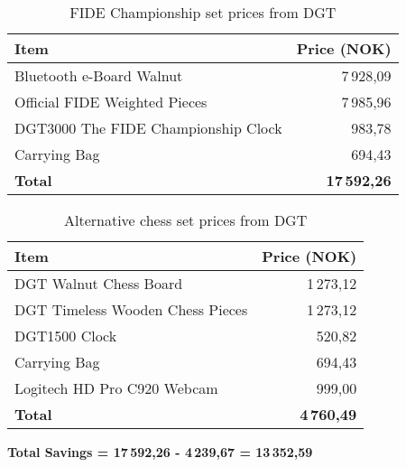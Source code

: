 \begin{table}[h!]
\centering
\caption[FIDE Championship set prices from DGT]{FIDE Championship set prices from DGT \cite{dgtshop:prices}}
\label{tab:price-comparison-standard}
\begin{tabular}{lr}
\toprule
Item & {Price (NOK)} \\
\midrule
Bluetooth e-Board Walnut & 7\,928,09 \\
Official FIDE Weighted Pieces & 7\,985,96 \\
DGT3000 The FIDE Championship Clock & 983,78 \\
Carrying Bag & 694,43 \\
\midrule
\textbf{Total} & \textbf{17\,592,26} \\
\bottomrule
\end{tabular}
\end{table}

\vspace{1cm}

\begin{table}[h!]
\centering
\caption[Alternative chess set prices from DGT]{Alternative chess set prices from DGT \cite{dgtshop:prices}}
\label{tab:price-comparison-alternative}
\begin{tabular}{lr}
\toprule
Item & {Price (NOK)} \\
\midrule
DGT Walnut Chess Board & 1\,273,12 \\
DGT Timeless Wooden Chess Pieces & 1\,273,12 \\
DGT1500 Clock & 520,82 \\
Carrying Bag & 694,43 \\
Logitech HD Pro C920 Webcam & 999,00 \\
\midrule
\textbf{Total} & \textbf{4\,760,49} \\
\bottomrule
\end{tabular}
\end{table}

\begin{center}
    \textbf{Total Savings = 17\,592,26 - 4\,239,67 = 13\,352,59}
\end{center}



